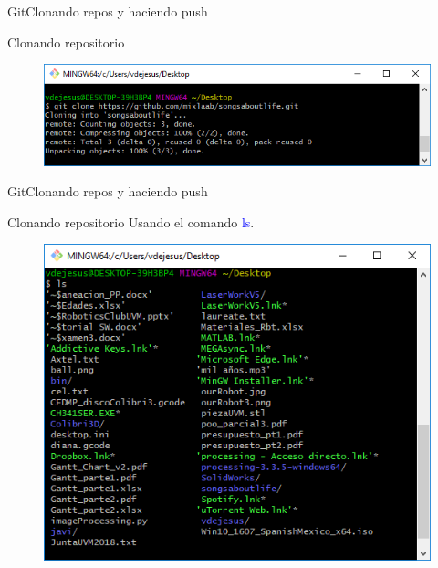 \documentclass[10pt]{beamer}
\begin{document}
\begin{frame}{Git}{Clonando repos y haciendo push}

\begin{block}{Clonando repositorio}


\begin{figure}[h!]
\centering
\includegraphics [scale=0.5]{gitclone2}
\label{fig:gitclone2}
\end{figure}

\end{block}

\end{frame}

\begin{frame}{Git}{Clonando repos y haciendo push}

\begin{block}{Clonando repositorio}
Usando el comando \textcolor{blue}{ls}.

\begin{figure}[h!]
\centering
\includegraphics [scale=0.5]{gitclone3}
\label{fig:gitclone3}
\end{figure}

\end{block}

\end{frame}
\end{document}
